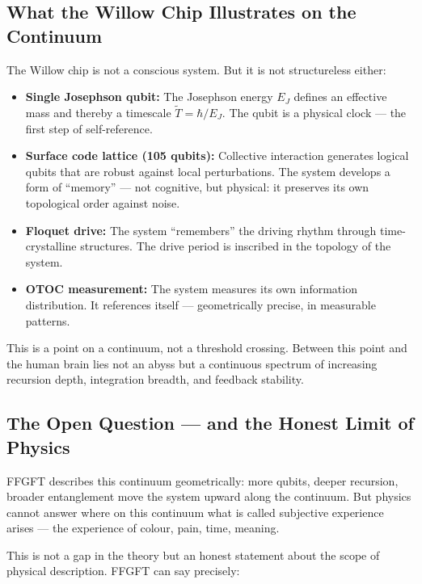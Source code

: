 \subsection{What the Willow Chip Illustrates on the Continuum}

The Willow chip is not a conscious system. But it is not structureless either:

\begin{itemize}
    \item \textbf{Single Josephson qubit:} The Josephson energy $E_J$ defines an
    effective mass and thereby a timescale $\tilde{T} = \hbar/E_J$. The qubit is a
    physical clock — the first step of self-reference.
    \item \textbf{Surface code lattice (105 qubits):} Collective interaction generates
    logical qubits that are robust against local perturbations. The system develops a
    form of ``memory'' — not cognitive, but physical: it preserves its own topological
    order against noise.
    \item \textbf{Floquet drive:} The system ``remembers'' the driving rhythm through
    time-crystalline structures. The drive period is inscribed in the topology of the
    system.
    \item \textbf{OTOC measurement:} The system measures its own information
    distribution. It references itself — geometrically precise, in measurable patterns.
\end{itemize}

This is a point on a continuum, not a threshold crossing. Between this point and the
human brain lies not an abyss but a continuous spectrum of increasing recursion depth,
integration breadth, and feedback stability.

\subsection{The Open Question — and the Honest Limit of Physics}

FFGFT describes this continuum geometrically: more qubits, deeper recursion, broader
entanglement move the system upward along the continuum. But physics cannot answer
where on this continuum what is called subjective experience arises — the experience
of colour, pain, time, meaning.

This is not a gap in the theory but an honest statement about the scope of physical
description. FFGFT can say precisely:


